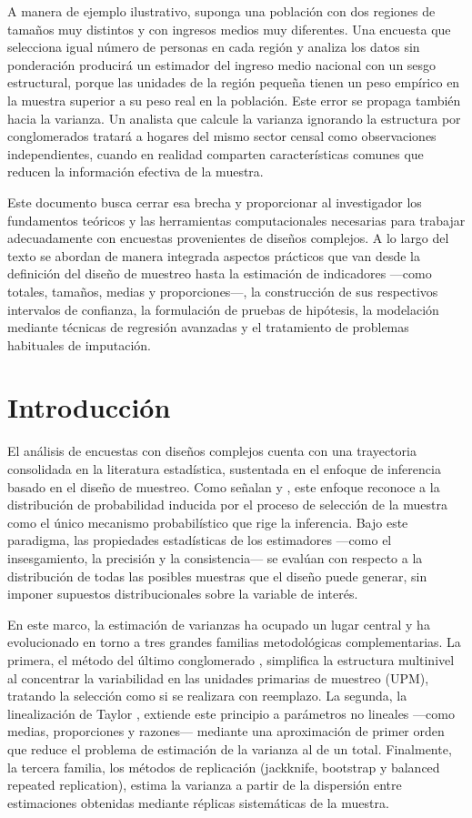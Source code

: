 \documentclass[
  spanish,
  12pt,
]{book}
\begin{document}
A manera de ejemplo ilustrativo, suponga una población con dos regiones de tamaños muy distintos y con ingresos medios muy diferentes. Una encuesta que selecciona igual número de personas en cada región y analiza los datos sin ponderación producirá un estimador del ingreso medio nacional con un sesgo estructural, porque las unidades de la región pequeña tienen un peso empírico en la muestra superior a su peso real en la población. Este error se propaga también hacia la varianza. Un analista que calcule la varianza ignorando la estructura por conglomerados tratará a hogares del mismo sector censal como observaciones independientes, cuando en realidad comparten características comunes que reducen la información efectiva de la muestra.

Este documento busca cerrar esa brecha y proporcionar al investigador los fundamentos teóricos y las herramientas computacionales necesarias para trabajar adecuadamente con encuestas provenientes de diseños complejos. A lo largo del texto se abordan de manera integrada aspectos prácticos que van desde la definición del diseño de muestreo hasta la estimación de indicadores ---como totales, tamaños, medias y proporciones---, la construcción de sus respectivos intervalos de confianza, la formulación de pruebas de hipótesis, la modelación mediante técnicas de regresión avanzadas y el tratamiento de problemas habituales de imputación.

\chapter{Introducción}\label{cap1}

El análisis de encuestas con diseños complejos cuenta con una trayectoria consolidada en la literatura estadística, sustentada en el enfoque de inferencia basado en el diseño de muestreo. Como señalan \citet{sarndal2003model} y \citet{Gutierrez2016}, este enfoque reconoce a la distribución de probabilidad inducida por el proceso de selección de la muestra como el único mecanismo probabilístico que rige la inferencia. Bajo este paradigma, las propiedades estadísticas de los estimadores ---como el insesgamiento, la precisión y la consistencia--- se evalúan con respecto a la distribución de todas las posibles muestras que el diseño puede generar, sin imponer supuestos distribucionales sobre la variable de interés.

En este marco, la estimación de varianzas ha ocupado un lugar central y ha evolucionado en torno a tres grandes familias metodológicas complementarias. La primera, el método del último conglomerado \citep{hansen1953sample}, simplifica la estructura multinivel al concentrar la variabilidad en las unidades primarias de muestreo (UPM), tratando la selección como si se realizara con reemplazo. La segunda, la linealización de Taylor \citep{binder1983variances}, extiende este principio a parámetros no lineales ---como medias, proporciones y razones--- mediante una aproximación de primer orden que reduce el problema de estimación de la varianza al de un total. Finalmente, la tercera familia, los métodos de replicación (jackknife, bootstrap y balanced repeated replication), estima la varianza a partir de la dispersión entre estimaciones obtenidas mediante réplicas sistemáticas de la muestra.
\end{document}

